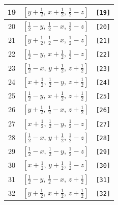 \documentclass[fleqn,8pt]{jsarticle}
\begin{document}
\begin{longtable}{ccc}
19 & $\left[ y + \frac{1}{2},\, x + \frac{1}{2},\, \frac{1}{2} - z \right]$ & {\tt [19]} \\ \hline
20 & $\left[ \frac{1}{2} - y,\, \frac{1}{2} - x,\, \frac{1}{2} - z \right]$ & {\tt [20]} \\ \hline
21 & $\left[ y + \frac{1}{2},\, \frac{1}{2} - x,\, \frac{1}{2} - z \right]$ & {\tt [21]} \\ \hline
22 & $\left[ \frac{1}{2} - y,\, x + \frac{1}{2},\, \frac{1}{2} - z \right]$ & {\tt [22]} \\ \hline
23 & $\left[ \frac{1}{2} - x,\, y + \frac{1}{2},\, z + \frac{1}{2} \right]$ & {\tt [23]} \\ \hline
24 & $\left[ x + \frac{1}{2},\, \frac{1}{2} - y,\, z + \frac{1}{2} \right]$ & {\tt [24]} \\ \hline
25 & $\left[ \frac{1}{2} - y,\, x + \frac{1}{2},\, z + \frac{1}{2} \right]$ & {\tt [25]} \\ \hline
26 & $\left[ y + \frac{1}{2},\, \frac{1}{2} - x,\, z + \frac{1}{2} \right]$ & {\tt [26]} \\ \hline
27 & $\left[ x + \frac{1}{2},\, \frac{1}{2} - y,\, \frac{1}{2} - z \right]$ & {\tt [27]} \\ \hline
28 & $\left[ \frac{1}{2} - x,\, y + \frac{1}{2},\, \frac{1}{2} - z \right]$ & {\tt [28]} \\ \hline
29 & $\left[ \frac{1}{2} - x,\, \frac{1}{2} - y,\, \frac{1}{2} - z \right]$ & {\tt [29]} \\ \hline
30 & $\left[ x + \frac{1}{2},\, y + \frac{1}{2},\, \frac{1}{2} - z \right]$ & {\tt [30]} \\ \hline
31 & $\left[ \frac{1}{2} - y,\, \frac{1}{2} - x,\, z + \frac{1}{2} \right]$ & {\tt [31]} \\ \hline
32 & $\left[ y + \frac{1}{2},\, x + \frac{1}{2},\, z + \frac{1}{2} \right]$ & {\tt [32]} \\
\end{longtable}
\end{document}
